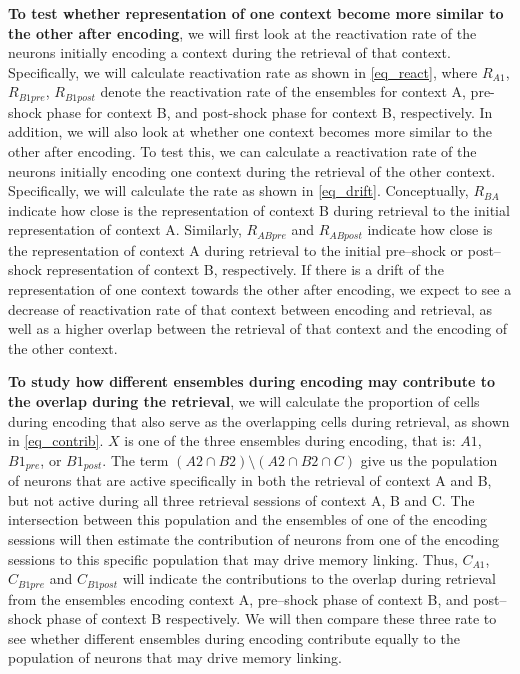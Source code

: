 \documentclass[master.tex]{subfiles}
\begin{document}
\textbf{To test whether representation of one context become more similar to the
  other after encoding}, we will first look at the reactivation rate of the
neurons initially encoding a context during the retrieval of that context.
Specifically, we will calculate reactivation rate as shown in
\autoref{eq_react}, where $R_{A1}$, $R_{B1pre}$, $R_{B1post}$ denote the
reactivation rate of the ensembles for context A, pre-shock phase for context B,
and post-shock phase for context B, respectively. In addition, we will also look
at whether one context becomes more similar to the other after encoding. To test
this, we can calculate a reactivation rate of the neurons initially encoding one
context during the retrieval of the other context. Specifically, we will
calculate the rate as shown in \autoref{eq_drift}. Conceptually, $R_{BA}$
indicate how close is the representation of context B during retrieval to the
initial representation of context A. Similarly, $R_{ABpre}$ and $R_{ABpost}$
indicate how close is the representation of context A during retrieval to the
initial pre--shock or post--shock representation of context B, respectively. If
there is a drift of the representation of one context towards the other after
encoding, we expect to see a decrease of reactivation rate of that context
between encoding and retrieval, as well as a higher overlap between the
retrieval of that context and the encoding of the other context.

\textbf{To study how different ensembles during encoding may contribute to the
  overlap during the retrieval}, we will calculate the proportion of cells
during encoding that also serve as the overlapping cells during retrieval, as
shown in \autoref{eq_contrib}. $X$ is one of the three ensembles during
encoding, that is: $A1$, $B1_{pre}$, or $B1_{post}$. The term $(A2 \cap B2)
\setminus (A2 \cap B2 \cap C)$ give us the population of neurons that are active
specifically in both the retrieval of context A and B, but not active during all
three retrieval sessions of context A, B and C. The intersection between this
population and the ensembles of one of the encoding sessions will then estimate
the contribution of neurons from one of the encoding sessions to this specific
population that may drive memory linking. Thus, $C_{A1}$, $C_{B1pre}$ and
$C_{B1post}$ will indicate the contributions to the overlap during retrieval
from the ensembles encoding context A, pre--shock phase of context B, and
post--shock phase of context B respectively. We will then compare these three
rate to see whether different ensembles during encoding contribute equally to
the population of neurons that may drive memory linking.
\end{document}
